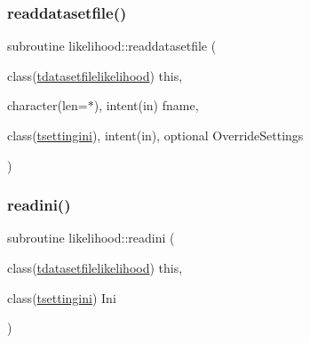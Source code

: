 \mbox{\label{namespacelikelihood_a9c3cb6205269d789cb3bbe6ad6a87eab}} 
\subsubsection{\texorpdfstring{readdatasetfile()}{readdatasetfile()}}
{\footnotesize\ttfamily subroutine likelihood\+::readdatasetfile (\begin{DoxyParamCaption}\item[{class(\mbox{\hyperlink{structlikelihood_1_1tdatasetfilelikelihood}{tdatasetfilelikelihood}})}]{this,  }\item[{character(len=$\ast$), intent(in)}]{fname,  }\item[{class(\mbox{\hyperlink{structsettings_1_1tsettingini}{tsettingini}}), intent(in), optional}]{Override\+Settings }\end{DoxyParamCaption})\hspace{0.3cm}{\ttfamily [private]}}

\mbox{\label{namespacelikelihood_a0d0df908a010f1e6ba689f48acdf156f}} 
\subsubsection{\texorpdfstring{readini()}{readini()}}
{\footnotesize\ttfamily subroutine likelihood\+::readini (\begin{DoxyParamCaption}\item[{class(\mbox{\hyperlink{structlikelihood_1_1tdatasetfilelikelihood}{tdatasetfilelikelihood}})}]{this,  }\item[{class(\mbox{\hyperlink{structsettings_1_1tsettingini}{tsettingini}})}]{Ini }\end{DoxyParamCaption})\hspace{0.3cm}{\ttfamily [private]}}

